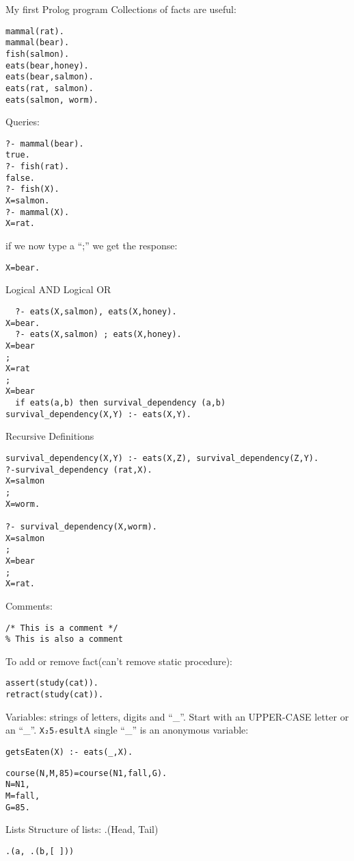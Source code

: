 \begin{טבלא}[!htbp]
        My first Prolog program
        Collections of facts are useful:
\begin{verbatim}
mammal(rat).
mammal(bear).
fish(salmon).
eats(bear,honey).
eats(bear,salmon).
eats(rat, salmon).
eats(salmon, worm).
\end{verbatim}

        Queries:
\begin{verbatim}
?- mammal(bear).
true.
?- fish(rat).
false.
?- fish(X).
X=salmon.
?- mammal(X).
X=rat.
\end{verbatim}
        if we now type a “;” we get the response:
\begin{verbatim}
X=bear.
\end{verbatim}

        Logical AND
        Logical OR
\begin{verbatim}
  ?- eats(X,salmon), eats(X,honey).
X=bear.
  ?- eats(X,salmon) ; eats(X,honey).
X=bear
;
X=rat
;
X=bear
  if eats(a,b) then survival_dependency (a,b)
survival_dependency(X,Y) :- eats(X,Y).
\end{verbatim}

        Recursive Definitions
\begin{verbatim}
survival_dependency(X,Y) :- eats(X,Z), survival_dependency(Z,Y).
?-survival_dependency (rat,X).
X=salmon
;
X=worm.

?- survival_dependency(X,worm).
X=salmon
;
X=bear
;
X=rat.

\end{verbatim}
        Comments:
\begin{verbatim}
/* This is a comment */
% This is also a comment
\end{verbatim}

        To add or remove fact(can’t remove static procedure):
\begin{verbatim}
assert(study(cat)).
retract(study(cat)).
\end{verbatim}

Variables: strings of letters, digits and “\_”. Start with an UPPER-CASE letter or an “\_”.
\verb+X₂5ᵣesult+A single “\_” is an anonymous variable:
\begin{verbatim}
getsEaten(X) :- eats(_,X).
\end{verbatim}

\begin{verbatim}
course(N,M,85)=course(N1,fall,G).
N=N1,
M=fall,
G=85.
\end{verbatim}

        Lists
        Structure of lists: .(Head, Tail)
\begin{verbatim}
.(a, .(b,[ ]))
\end{verbatim}


\end{טבלא}
